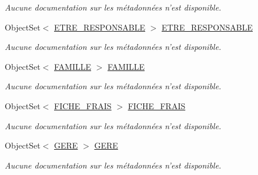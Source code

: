 \begin{DoxyCompactItemize}
\begin{DoxyCompactList}\small\item\em Aucune documentation sur les métadonnées n'est disponible. \end{DoxyCompactList}\item 
Object\-Set$<$ \hyperlink{class_model_1_1_e_t_r_e___r_e_s_p_o_n_s_a_b_l_e}{E\-T\-R\-E\-\_\-\-R\-E\-S\-P\-O\-N\-S\-A\-B\-L\-E} $>$ \hyperlink{class_model_1_1_b_d_d___s_i_o7_entities_a1dbcb102b5850c6301a5572fc07a6197}{E\-T\-R\-E\-\_\-\-R\-E\-S\-P\-O\-N\-S\-A\-B\-L\-E}
\begin{DoxyCompactList}\small\item\em Aucune documentation sur les métadonnées n'est disponible. \end{DoxyCompactList}\item 
Object\-Set$<$ \hyperlink{class_model_1_1_f_a_m_i_l_l_e}{F\-A\-M\-I\-L\-L\-E} $>$ \hyperlink{class_model_1_1_b_d_d___s_i_o7_entities_a8fa0833a2b61c9d1f6d20a5c207f0f08}{F\-A\-M\-I\-L\-L\-E}
\begin{DoxyCompactList}\small\item\em Aucune documentation sur les métadonnées n'est disponible. \end{DoxyCompactList}\item 
Object\-Set$<$ \hyperlink{class_model_1_1_f_i_c_h_e___f_r_a_i_s}{F\-I\-C\-H\-E\-\_\-\-F\-R\-A\-I\-S} $>$ \hyperlink{class_model_1_1_b_d_d___s_i_o7_entities_a8dc9fa4a25f4ad033b363e8d1edb07d0}{F\-I\-C\-H\-E\-\_\-\-F\-R\-A\-I\-S}
\begin{DoxyCompactList}\small\item\em Aucune documentation sur les métadonnées n'est disponible. \end{DoxyCompactList}\item 
Object\-Set$<$ \hyperlink{class_model_1_1_g_e_r_e}{G\-E\-R\-E} $>$ \hyperlink{class_model_1_1_b_d_d___s_i_o7_entities_af2d24722ba6d84b64960611c55b23327}{G\-E\-R\-E}
\begin{DoxyCompactList}\small\item\em Aucune documentation sur les métadonnées n'est disponible. \end{DoxyCompactList}\item 

\end{DoxyCompactItemize}
